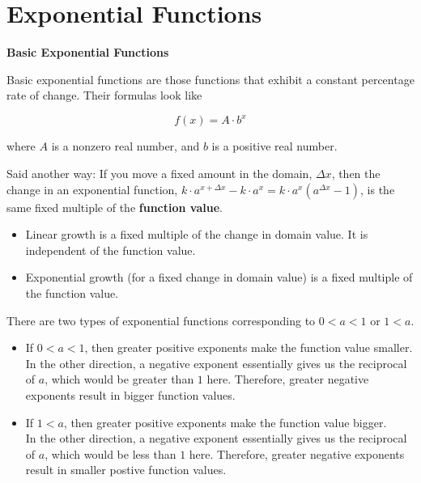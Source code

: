 \documentclass{ximera}
\begin{document}
\section*{Exponential Functions}


\begin{definition} \textbf{\textcolor{green!50!black}{Basic Exponential Functions}}

Basic exponential functions are those functions that exhibit a constant percentage rate of change.  Their formulas look like


\[      f(x) = A \cdot b^x   \]

where $A$ is a nonzero real number, and $b$ is a positive real number.


\end{definition}



Said another way:  If you move a fixed amount in the domain, $\Delta x$, then the change in an exponential function, $k \cdot a^{x + \Delta x} - k \cdot a^x = k \cdot a^x (a^{\Delta x} - 1)$, is the same fixed multiple of the \textbf{function value}.

\begin{itemize}
\item Linear growth is a fixed multiple of the change in domain value. It is independent of the function value.
\item Exponential growth (for a fixed change in domain value) is a fixed multiple of the function value. 
\end{itemize}





There are two types of exponential functions corresponding to $0<a<1$ or $1<a$.






\begin{itemize}
\item If $0<a<1$, then greater positive exponents make the function value smaller.   \\
In the other direction, a negative exponent essentially gives us the reciprocal of $a$, which would be greater than $1$ here.  Therefore, greater negative exponents result in bigger function values. \\

\item If $1<a$, then greater positive exponents make the function value bigger.   \\ 
In the other direction, a negative exponent essentially gives us the reciprocal of $a$, which would be less than $1$ here.  Therefore, greater negative exponents result in smaller postive function values.
\end{itemize}
\end{document}
